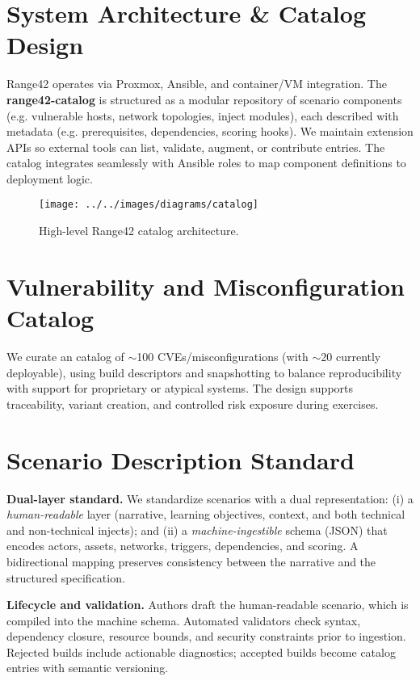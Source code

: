 \documentclass[11pt]{article}
\begin{document}
\section{System Architecture \& Catalog Design}
Range42 operates via Proxmox, Ansible, and container/VM integration.  
The \textbf{range42-catalog} is structured as a modular repository of scenario components (e.g. vulnerable hosts, network topologies, inject modules), each described with metadata (e.g. prerequisites, dependencies, scoring hooks). We maintain extension APIs so external tools can list, validate, augment, or contribute entries. The catalog integrates seamlessly with Ansible roles to map component definitions to deployment logic.

\begin{figure}[h]
\centering
\texttt{[image: ../../images/diagrams/catalog]}
\caption{High-level Range42 catalog architecture.}
\label{fig:arch_catalog}
\end{figure}

\section{Vulnerability and Misconfiguration Catalog}
We curate an catalog of $\sim$100 CVEs/misconfigurations (with $\sim$20 currently deployable), using build descriptors and snapshotting to balance reproducibility with support for proprietary or atypical systems. The design supports traceability, variant creation, and controlled risk exposure during exercises.

\section{Scenario Description Standard}

\textbf{Dual-layer standard.} We standardize scenarios with a dual representation:
(i) a \emph{human-readable} layer (narrative, learning objectives, context, and both technical and non-technical injects); and
(ii) a \emph{machine-ingestible} schema (JSON) that encodes actors, assets, networks, triggers, dependencies, and scoring.
A bidirectional mapping preserves consistency between the narrative and the structured specification.

\textbf{Lifecycle and validation.} Authors draft the human-readable scenario, which is compiled into the machine schema.
Automated validators check syntax, dependency closure, resource bounds, and security constraints prior to ingestion.
Rejected builds include actionable diagnostics; accepted builds become catalog entries with semantic versioning.
\end{document}
